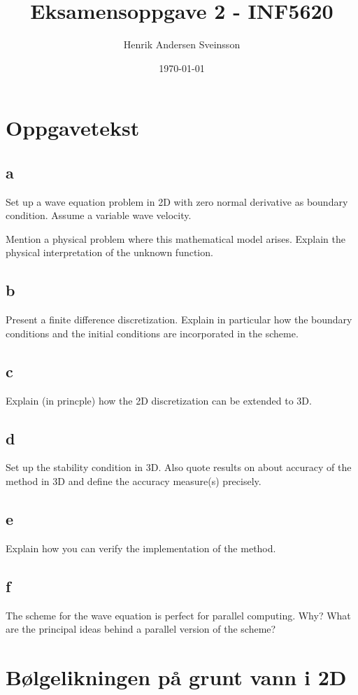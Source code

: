 \documentclass[a4paper, 10pt]{article}
\author{Henrik Andersen Sveinsson}
\title{Eksamensoppgave 2 - INF5620}
\date{\today}
\begin{document}
\maketitle

\section{Oppgavetekst}

\subsection*{a}
 Set up a wave equation problem in 2D with zero normal derivative as boundary condition. Assume a variable wave velocity.

Mention a physical problem where this mathematical model arises. Explain the physical interpretation of the unknown function.
\subsection*{b}
 Present a finite difference discretization. Explain in particular how the boundary conditions and the initial conditions are incorporated in the scheme.
\subsection*{c}
 Explain (in princple) how the 2D discretization can be extended to 3D.
\subsection*{d}
 Set up the stability condition in 3D. Also quote results on about accuracy of the method in 3D and define the accuracy measure(s) precisely.
\subsection*{e}
 Explain how you can verify the implementation of the method.
\subsection*{f}
 The scheme for the wave equation is perfect for parallel computing. Why? What are the principal ideas behind a parallel version of the scheme? 

\section{Bølgelikningen på grunt vann i 2D}
\end{document}

